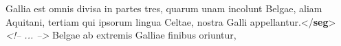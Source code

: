 \begin{shaded}
\hspace*{1em}\hspace*{1em}\hspace*{1em}\hspace*{1em}\hspace*{1em}Gallia est omnis divisa in partes tres, quarum unam\mbox{}\newline 
\hspace*{1em}\hspace*{1em}\hspace*{1em}\hspace*{1em}\hspace*{1em}\hspace*{1em}\hspace*{1em}\hspace*{1em}\hspace*{1em}\hspace*{1em}\hspace*{1em}\hspace*{1em} incolunt Belgae, aliam Aquitani, tertiam qui ipsorum lingua Celtae, nostra\mbox{}\newline 
\hspace*{1em}\hspace*{1em}\hspace*{1em}\hspace*{1em}\hspace*{1em}\hspace*{1em}\hspace*{1em}\hspace*{1em}\hspace*{1em}\hspace*{1em}\hspace*{1em}\hspace*{1em} Galli appellantur.{</\textbf{seg}>}\mbox{}\newline 
\textit{<!-- ... -->}\mbox{}\newline 
\hspace*{1em}\hspace*{1em}\hspace*{1em}\hspace*{1em}\hspace*{1em}Belgae ab extremis Galliae finibus oriuntur,\mbox{}\newline 

\end{shaded}
